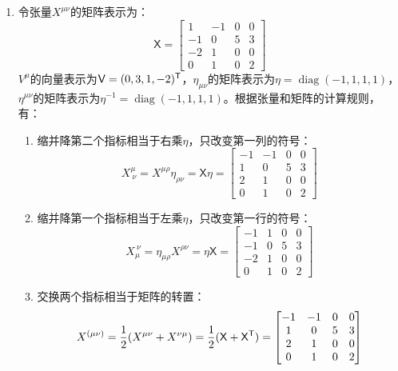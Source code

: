 \documentclass[a4paper]{article}
\DeclareMathOperator{\diag}{diag}
\newcommand{\trans}{\text{\textsf{T}}}
\begin{document}
\begin{enumerate}
    \bigskip
    \item[2.]
    令张量$X^{\mu\nu}$的矩阵表示为：
    \[
        \mathsf{X} =
        \begin{bmatrix}
            1 & -1 & 0 & 0 \\
            -1 & 0 & 5 & 3 \\
            -2 & 1 & 0 & 0 \\
            0 & 1 & 0 & 2
        \end{bmatrix}
    \]
    $V^\mu$的向量表示为$\mathsf{V} = (0,3,1,-2)^\trans$，$\eta_{\mu\nu}$的矩阵表示为$\mathsf{\eta} = \diag{(-1,1,1,1)}$，$\eta^{\mu\nu}$的矩阵表示为$\mathsf{\eta}^{-1} = \diag{(-1,1,1,1)}$。根据张量和矩阵的计算规则，有：
    \begin{enumerate}
        \item[(a)]
        缩并降第二个指标相当于右乘$\mathsf{\eta}$，只改变第一列的符号：
        \[
        X^\mu_{\ \nu} = X^{\mu\rho} \eta_{\rho\nu} = \mathsf{X \eta} =
        \begin{bmatrix}
            -1 & -1 & 0 & 0 \\
            1 & 0 & 5 & 3 \\
            2 & 1 & 0 & 0 \\
            0 & 1 & 0 & 2
        \end{bmatrix}
        \]

        \item[(b)]
        缩并降第一个指标相当于左乘$\mathsf{\eta}$，只改变第一行的符号：
        \[
        X_\mu^{\ \nu} = \eta_{\mu\rho} X^{\rho\nu} = \mathsf{\eta X} =
        \begin{bmatrix}
            -1 & 1 & 0 & 0 \\
            -1 & 0 & 5 & 3 \\
            -2 & 1 & 0 & 0 \\
            0 & 1 & 0 & 2
        \end{bmatrix}
        \]

        \item[(c)]
        交换两个指标相当于矩阵的转置：
        \[
        X^{(\mu\nu)} = \frac{1}{2}(X^{\mu\nu} + X^{\nu\mu}) = \frac{1}{2} (\mathsf{X} + \mathsf{X}^\trans) =
        \begin{bmatrix}
            -1 & -1 & 0 & 0 \\
            1 & 0 & 5 & 3 \\
            2 & 1 & 0 & 0 \\
            0 & 1 & 0 & 2
        \end{bmatrix}
        \]


\end{enumerate}
\end{enumerate}
\end{document}

